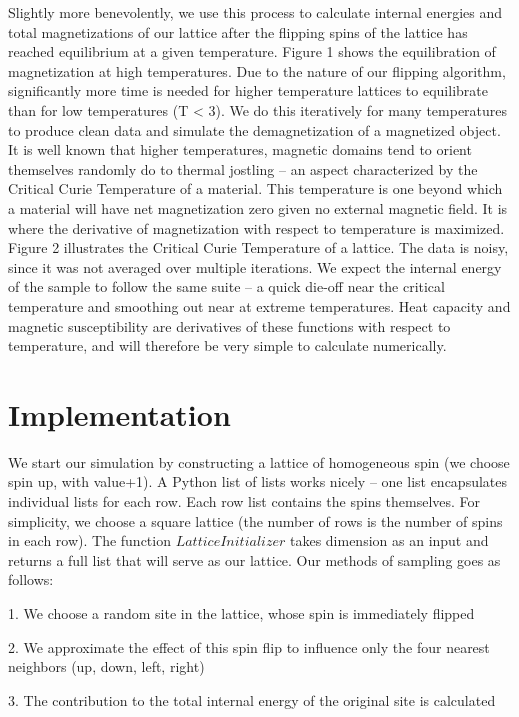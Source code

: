 \documentclass[a4paper]{article}
\begin{document}
Slightly more benevolently, we use this process to calculate internal energies and total magnetizations of our lattice after the flipping spins of the lattice has reached equilibrium at a given temperature. Figure 1 shows the equilibration of magnetization at high temperatures. Due to the nature of our flipping algorithm, significantly more time is needed for higher temperature lattices to equilibrate than for low temperatures (T < 3). We do this iteratively for many temperatures to produce clean data and simulate the demagnetization of a magnetized object. It is well known that higher temperatures, magnetic domains tend to orient themselves randomly do to thermal jostling – an aspect characterized by the Critical Curie Temperature of a material. This temperature is one beyond which a material will have net magnetization zero given no external magnetic field. It is where the derivative of magnetization with respect to temperature is maximized. Figure 2 illustrates the Critical Curie Temperature of a lattice. The data is noisy, since it was not averaged over multiple iterations. We expect the internal energy of the sample to follow the same suite – a quick die-off near the critical temperature and smoothing out near at extreme temperatures. Heat capacity and magnetic susceptibility are derivatives of these functions with respect to temperature, and will therefore be very simple to calculate numerically. 


\section{Implementation}



We start our simulation by constructing a lattice of homogeneous spin (we choose spin up, with value+1). A Python list of lists works nicely – one list encapsulates individual lists for each row. Each row list contains the spins themselves. For simplicity, we choose a square lattice (the number of rows is the number of spins in each row). The function $Lattice Initializer$ takes dimension as an input and returns a full list that will serve as our lattice. Our methods of sampling goes as follows:


	1.	We choose a random site in the lattice, whose spin is immediately flipped


	2.	We approximate the effect of this spin flip to influence only the four nearest neighbors (up, down, left, right)


	3.	The contribution to the total internal energy of the original site is calculated 
\end{document}
